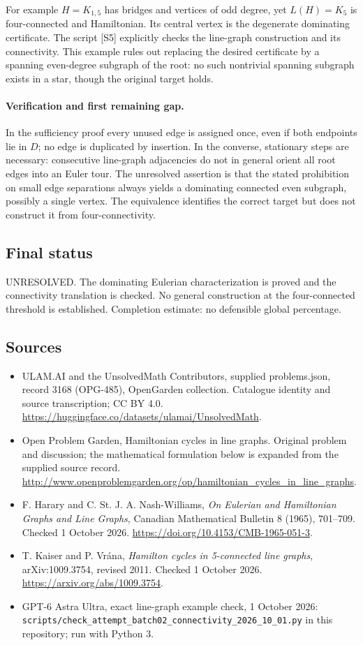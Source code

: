 \documentclass[11pt,a4paper]{article}
\begin{document}
For example $H=K_{1,5}$ has bridges and vertices of odd degree, yet
$L(H)=K_5$ is four-connected and Hamiltonian. Its central vertex is
the degenerate dominating certificate. The script [S5] explicitly checks
the line-graph construction and its connectivity. This example rules
out replacing the desired certificate by a spanning even-degree
subgraph of the root: no such nontrivial spanning subgraph exists
in a star, though the original target holds.

\paragraph{Verification and first remaining gap.}
In the sufficiency proof every unused edge is assigned once, even
if both endpoints lie in $D$; no edge is duplicated by insertion.
In the converse, stationary steps are necessary: consecutive
line-graph adjacencies do not in general orient all root edges into
an Euler tour. The unresolved assertion is that the stated prohibition
on small edge separations always yields a dominating connected even
subgraph, possibly a single vertex. The equivalence identifies the
correct target but does not construct it from four-connectivity.

\subsection{Final status}
UNRESOLVED. The dominating Eulerian characterization is proved and the
connectivity translation is checked. No general construction at the
four-connected threshold is established. Completion estimate: no
defensible global percentage.

\subsection{Sources}
\begin{itemize}
\item[S1] ULAM.AI and the UnsolvedMath Contributors, supplied problems.json, record 3168 (OPG-485), OpenGarden collection. Catalogue identity and source transcription; CC BY 4.0.
\url{https://huggingface.co/datasets/ulamai/UnsolvedMath}.
\item[S2] Open Problem Garden, Hamiltonian cycles in line graphs. Original problem and discussion; the mathematical formulation below is expanded from the supplied source record.
\url{http://www.openproblemgarden.org/op/hamiltonian_cycles_in_line_graphs}.
\item[S3] F. Harary and C. St. J. A. Nash-Williams, \emph{On Eulerian and Hamiltonian Graphs and Line Graphs}, Canadian Mathematical Bulletin 8 (1965), 701--709. Checked 1 October 2026.
\url{https://doi.org/10.4153/CMB-1965-051-3}.
\item[S4] T. Kaiser and P. Vrána, \emph{Hamilton cycles in 5-connected line graphs}, arXiv:1009.3754, revised 2011. Checked 1 October 2026.
\url{https://arxiv.org/abs/1009.3754}.
\item[S5] GPT-6 Astra Ultra, exact line-graph example check, 1 October 2026: \texttt{scripts/check\_attempt\_batch02\_connectivity\_2026\_10\_01.py} in this repository; run with Python 3.
\end{itemize}
\end{document}
